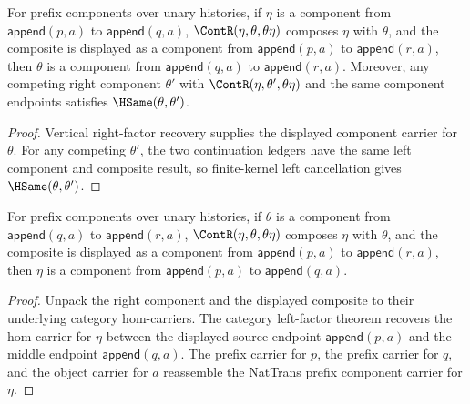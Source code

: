 \begin{theorem}
\label{thm:nattrans-prefix-component-carrier-vert-comp-right-factor-public-readback}
For prefix components over unary histories, if $\eta$ is a component from
$\mathsf{append}(p,a)$ to $\mathsf{append}(q,a)$,
$\ContR(\eta,\theta,\theta\eta)$ composes $\eta$ with $\theta$, and the
composite is displayed as a component from $\mathsf{append}(p,a)$ to
$\mathsf{append}(r,a)$, then $\theta$ is a component from
$\mathsf{append}(q,a)$ to $\mathsf{append}(r,a)$. Moreover, any competing
right component $\theta'$ with $\ContR(\eta,\theta',\theta\eta)$ and the same
component endpoints satisfies $\HSame(\theta,\theta')$.
\end{theorem}
\begin{proof}
Vertical right-factor recovery supplies the displayed component carrier for
$\theta$. For any competing $\theta'$, the two continuation ledgers have the
same left component and composite result, so finite-kernel left cancellation
gives $\HSame(\theta,\theta')$.
\end{proof}

\begin{theorem}
\label{thm:nattrans-prefix-component-carrier-vert-comp-left-factor}
For prefix components over unary histories, if $\theta$ is a component from
$\mathsf{append}(q,a)$ to $\mathsf{append}(r,a)$,
$\ContR(\eta,\theta,\theta\eta)$ composes $\eta$ with $\theta$, and the
composite is displayed as a component from $\mathsf{append}(p,a)$ to
$\mathsf{append}(r,a)$, then $\eta$ is a component from
$\mathsf{append}(p,a)$ to $\mathsf{append}(q,a)$.
\end{theorem}
\begin{proof}
Unpack the right component and the displayed composite to their underlying
category hom-carriers. The category left-factor theorem recovers the
hom-carrier for $\eta$ between the displayed source endpoint
$\mathsf{append}(p,a)$ and the middle endpoint $\mathsf{append}(q,a)$. The
prefix carrier for $p$, the prefix carrier for $q$, and the object carrier for
$a$ reassemble the NatTrans prefix component carrier for $\eta$.
\end{proof}

